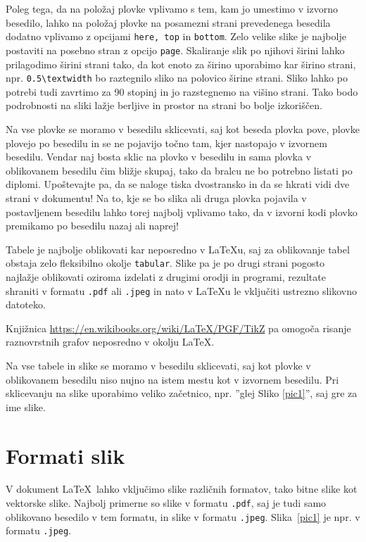 \documentclass[a4paper,12pt,openright]{book}
\begin{document}
    Poleg tega, da na položaj plovke vplivamo s tem, kam jo umestimo v izvorno besedilo, lahko na položaj plovke na posamezni strani prevedenega besedila dodatno vplivamo z opcijami \texttt{here, top} in \texttt{bottom}.
    Zelo velike slike je najbolje postaviti na posebno stran z opcijo \texttt{page}.
    Skaliranje slik po njihovi širini lahko prilagodimo širini strani tako, da kot enoto za širino uporabimo kar širino strani, npr. \verb=0.5\textwidth= bo raztegnilo sliko na polovico širine strani.
    Sliko lahko po potrebi tudi zavrtimo za 90 stopinj in jo razstegnemo na višino strani.
    Tako bodo podrobnosti na sliki lažje berljive in prostor na strani bo bolje izkoriščen.

    Na vse plovke se moramo v besedilu sklicevati, saj kot beseda plovka pove, plovke plovejo po besedilu in se ne pojavijo točno tam, kjer nastopajo v izvornem besedilu.
    Vendar naj bosta sklic na plovko v besedilu in sama plovka v oblikovanem besedilu čim bližje skupaj, tako da bralcu ne bo potrebno listati po diplomi.
    Upoštevajte pa, da se naloge tiska dvostransko in da se hkrati vidi dve strani v dokumentu!
    Na to, kje se bo slika ali druga plovka pojavila v postavljenem besedilu lahko torej najbolj vplivamo tako, da v izvorni kodi plovko premikamo po besedilu nazaj ali naprej!

    Tabele je najbolje oblikovati kar neposredno v \LaTeX u, saj za oblikovanje tabel obstaja zelo fleksibilno okolje \texttt{tabular}.
    Slike pa je po drugi strani pogosto najla\v zje oblikovati oziroma izdelati z drugimi orodji in programi, rezultate shraniti v formatu {\tt .pdf} ali {\tt .jpeg} in nato v \LaTeX u le vključiti ustrezno slikovno datoteko.

    Knjižnica \url{https://en.wikibooks.org/wiki/LaTeX/PGF/TikZ}
    pa omo\-go\-ča risanje raznovrstnih grafov neposredno v okolju \LaTeX .

    Na vse tabele in slike se moramo v besedilu sklicevati, saj kot plovke v oblikovanem besedilu niso nujno na istem mestu kot v izvornem besedilu.
    Pri sklicevanju na slike uporabimo veliko začetnico, npr. ''glej Sliko \ref{pic1}'', saj gre za ime slike.


    \section{Formati slik}

    V dokument \LaTeX\ lahko vključimo slike različnih formatov, tako
    bitne slike kot vektorske slike. Najbolj primerne so slike v formatu {\tt .pdf}, saj je tudi samo
    oblikovano besedilo v tem formatu, in slike v formatu {\tt .jpeg}.
    Slika~\ref{pic1} je npr. v formatu {\tt .jpeg}.
\end{document}
